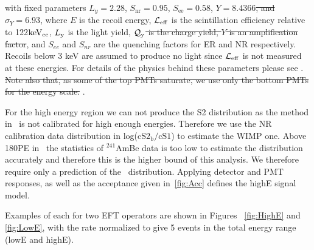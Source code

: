 with fixed parameters $L_y = 2.28$, $S_\mathrm{nr} = 0.95$, $S_\mathrm{ee} = 0.58$, \sout{$Y = 8.4366$, and $\sigma_Y = 6.93$}, where $E$ is the recoil energy, $\mathcal{L}_{\mathrm{eff}}$ is the scintillation efficiency relative to 122$\mathrm{keV_{ee}}$, $L_{\mathrm{y}}$ is the light yield, \sout{$\mathcal{Q}_{\mathrm{y}}$ is the charge yield, $Y$ is an amplification factor}, and $S_{ee}$ and $S_{nr}$ are the quenching factors for ER and NR respectively. Recoils below 3 keV are assumed to produce no light since $\mathcal{L}_{\mathrm{eff}}$ is not measured at these energies. For details of the physics behind these parameters please see \cite{xe100_ana2012,xe100_run_combination}.  \sout{Note also that, as some of the top PMTs saturate, we use only the bottom PMTs for the energy scale.}  .

For the high energy region we can not produce the S2 distribution as the method in~\cite{DataMCXenon} is not calibrated for high enough energies. Therefore we use the NR calibration data distribution in log($\mathrm{cS2_b/cS1}$) to estimate the WIMP one. Above 180PE in \cSi\ the statistics of $^{241}$AmBe data is too low to estimate the distribution accurately and therefore this is the higher bound of this analysis. We therefore require only a prediction of the \cSi\ distribution. Applying detector and PMT responses, as well as the acceptance given in~\ref{fig:Acc} defines the highE signal model.

Examples of each for two EFT operators are shown in Figures ~\ref{fig:HighE} and \ref{fig:LowE}, with the rate normalized to give 5 events in the total energy range (lowE and highE).

